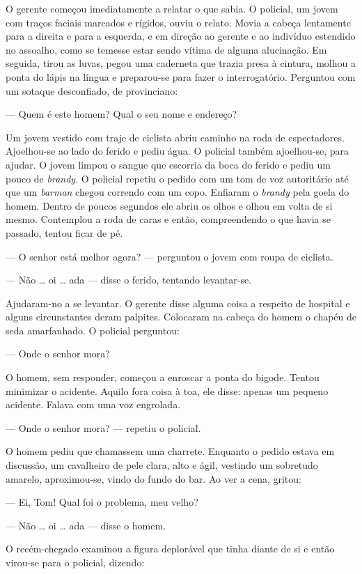 O gerente começou imediatamente a relatar o que sabia.  O policial, um jovem
com traços faciais marcados e rígidos, ouviu o relato.  Movia a cabeça
lentamente para a direita e para a esquerda, e em direção ao gerente e ao
indivíduo estendido no assoalho, como se temesse estar sendo vítima de alguma
alucinação.  Em seguida, tirou as luvas, pegou uma caderneta que trazia presa à
cintura, molhou a ponta do lápis na língua e preparou-se para fazer o
interrogatório.  Perguntou com um sotaque desconfiado, de provinciano:

--- Quem é este homem?  Qual o seu nome e endereço?

Um jovem vestido com traje de ciclista abriu caminho na roda de espectadores.
Ajoelhou-se ao lado do ferido e pediu água.  O policial também ajoelhou-se,
para ajudar.  O jovem limpou o sangue que escorria da boca do ferido e pediu um
pouco de \textit{brandy}.  O policial repetiu o pedido com um tom de voz
autoritário até que um \textit{barman} chegou correndo com um copo.  Enfiaram o
\textit{brandy} pela goela do homem.  Dentro de poucos segundos ele abriu os
olhos e olhou em volta de si mesmo.  Contemplou a roda de caras e então,
compreendendo o que havia se passado, tentou ficar de pé.

--- O senhor está melhor agora? --- perguntou o jovem com roupa de ciclista.

--- Não \ldots{} oi \ldots{} ada --- disse o ferido, tentando levantar-se.

Ajudaram-no a se levantar.  O gerente disse alguma coisa a respeito de hospital
e alguns circunstantes deram palpites.  Colocaram na cabeça do homem o chapéu
de seda amarfanhado.  O policial perguntou:

--- Onde o senhor mora?

O homem, sem responder, começou a enroscar a ponta do bigode.  Tentou minimizar
o acidente.  Aquilo fora coisa à toa, ele disse: apenas um pequeno acidente.
Falava com uma voz engrolada.

--- Onde o senhor mora? --- repetiu o policial.

O homem pediu que chamassem uma charrete.  Enquanto o pedido estava em
discussão, um cavalheiro de pele clara, alto e ágil, vestindo um sobretudo
amarelo, aproximou-se, vindo do fundo do bar.  Ao ver a cena, gritou:

--- Ei, Tom!  Qual foi o problema, meu velho?

--- Não \ldots{} oi \ldots{} ada --- disse o homem.

O recém-chegado examinou a figura deplorável que tinha diante de si e então
virou-se para o policial, dizendo:

